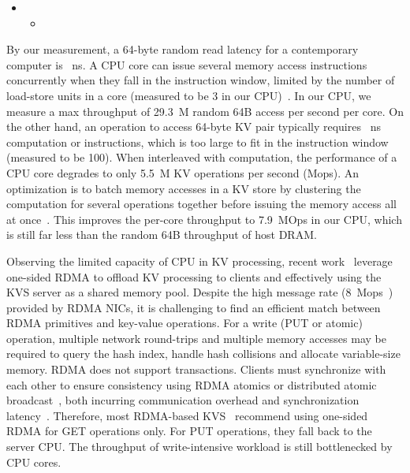 \begin{itemize}
\item 
\begin{itemize}
\item 
\end{itemize}
\end{itemize}
By our measurement, a 64-byte random read latency for a contemporary computer is ~ns. A CPU core can issue several memory access instructions concurrently when they fall in the instruction window, limited by the number of load-store units in a core (measured to be 3 in our CPU)~\cite{gharachorloo1992hiding, han2010packetshader, zhang2015mega}. In our CPU, we measure a max throughput of 29.3~M random 64B access per second per core. On the other hand, an operation to access 64-byte KV pair typically requires ~ns computation or  instructions, which is too large to fit in the instruction window (measured to be 100). When interleaved with computation, the performance of a CPU core degrades to only 5.5~M KV operations per second (Mops). An optimization is to batch memory accesses in a KV store by clustering the computation for several operations together before issuing the memory access all at once~\cite{li2016full, narula2014phase}. This improves the per-core throughput to 7.9~MOps in our CPU, which is still far less than the random 64B throughput of host DRAM.

Observing the limited capacity of CPU in KV processing, recent work~\cite{mitchell2013using,szepesi2014designing,dragojevic2014farm} leverage one-sided RDMA to offload KV processing to clients and effectively using the KVS server as a shared memory pool.
Despite the high message rate (8~Mops~\cite{kalia2016design}) provided by RDMA NICs, it is challenging to find an efficient match between RDMA primitives and key-value operations.
For a write (PUT or atomic) operation, multiple network round-trips and multiple memory accesses may be required to query the hash index, handle hash collisions and allocate variable-size memory.
RDMA does not support transactions. Clients must synchronize with each other to ensure consistency using RDMA atomics or distributed atomic broadcast~\cite{szepesi2014designing}, both incurring communication overhead and synchronization latency~\cite{mitchell2013using, dragojevic2014farm}.
Therefore, most RDMA-based KVS~\cite{mitchell2013using,dragojevic2014farm,kalia2014using} recommend using one-sided RDMA for GET operations only. For PUT operations, they fall back to the server CPU. The throughput of write-intensive workload is still bottlenecked by CPU cores.

